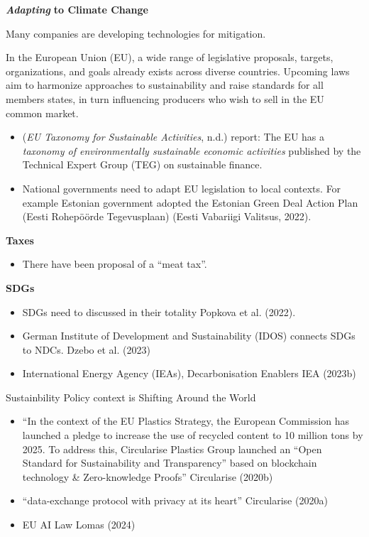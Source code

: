 \documentclass[
  letterpaper,
  DIV=11,
  numbers=noendperiod]{scrartcl}
\providecommand{\tightlist}{%
  \setlength{\itemsep}{0pt}\setlength{\parskip}{0pt}}\usepackage{longtable,booktabs,array}
\begin{document}
\textbf{\emph{Adapting}} \textbf{to Climate Change}

Many companies are developing technologies for mitigation.

In the European Union (EU), a wide range of legislative proposals,
targets, organizations, and goals already exists across diverse
countries. Upcoming laws aim to harmonize approaches to sustainability
and raise standards for all members states, in turn influencing
producers who wish to sell in the EU common market.

\begin{itemize}
\tightlist
\item
  (\emph{{EU} Taxonomy for Sustainable Activities}, n.d.) report: The EU
  has a \emph{taxonomy of environmentally sustainable economic
  activities} published by the Technical Expert Group (TEG) on
  sustainable finance.
\item
  National governments need to adapt EU legislation to local contexts.
  For example Estonian government adopted the Estonian Green Deal Action
  Plan (Eesti Rohepöörde Tegevusplaan) (Eesti Vabariigi Valitsus, 2022).
\end{itemize}

\textbf{Taxes}

\begin{itemize}
\tightlist
\item
  There have been proposal of a ``meat tax''.
\end{itemize}

\textbf{SDGs}

\begin{itemize}
\item
  SDGs need to discussed in their totality Popkova et al. (2022).
\item
  German Institute of Development and Sustainability (IDOS) connects
  SDGs to NDCs. Dzebo et al. (2023)
\item
  International Energy Agency (IEAs), Decarbonisation Enablers IEA
  (2023b)
\end{itemize}

Sustainbility Policy context is Shifting Around the World

\begin{itemize}
\item
  ``In the context of the EU Plastics Strategy, the European Commission
  has launched a pledge to increase the use of recycled content to 10
  million tons by 2025. To address this, Circularise Plastics Group
  launched an ``Open Standard for Sustainability and Transparency''
  based on blockchain technology \& Zero-knowledge Proofs'' Circularise
  (2020b)
\item
  ``data-exchange protocol with privacy at its heart'' Circularise
  (2020a)
\item
  EU AI Law Lomas (2024)
\end{itemize}
\end{document}
